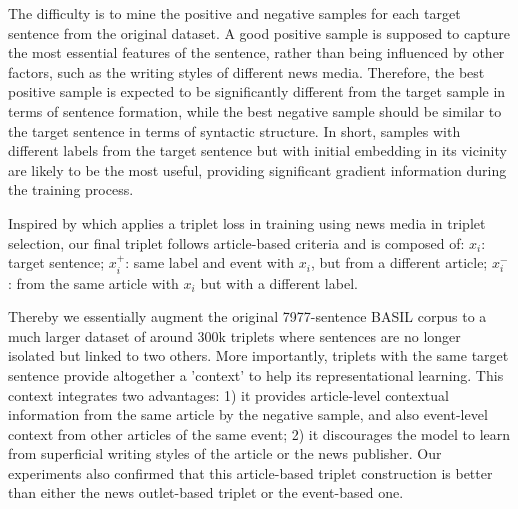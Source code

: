 \documentclass[letterpaper]{article} %
\begin{document}

The difficulty is to mine the positive and negative samples for each target sentence from the original dataset. A good positive sample is supposed to capture the most essential features of the sentence, rather than being influenced by other factors, such as the writing styles of different news media. Therefore, the best positive sample is expected to be significantly different from the target sample in terms of sentence formation, while the best negative sample should be similar to the target sentence in terms of syntactic structure. In short, samples with different labels from the target sentence but with initial embedding in its vicinity are likely to be the most useful, providing significant gradient information during the training process.

Inspired by \citet{baly-etal-2020-detect} which applies a triplet loss in training using news media in triplet selection, our final triplet follows article-based criteria and is composed of: $x_i$: target sentence; $x_i^+$: same label and event with $x_i$, but from a different article; $x_i^-$: from the same article with $x_i$ but with a different label. 

Thereby we essentially augment the original 7977-sentence BASIL corpus to a much larger dataset of around 300k triplets where sentences are no longer isolated but linked to two others. More importantly, triplets with the same target sentence provide altogether a 'context' to help its representational learning. This context integrates two advantages: 1) it provides article-level contextual information from the same article by the negative sample, and also event-level context from other articles of the same event; 2) it discourages the model to learn from superficial writing styles of the article or the news publisher. Our experiments also confirmed that this article-based triplet construction is better than either the news outlet-based triplet or the event-based one.

\end{document}
